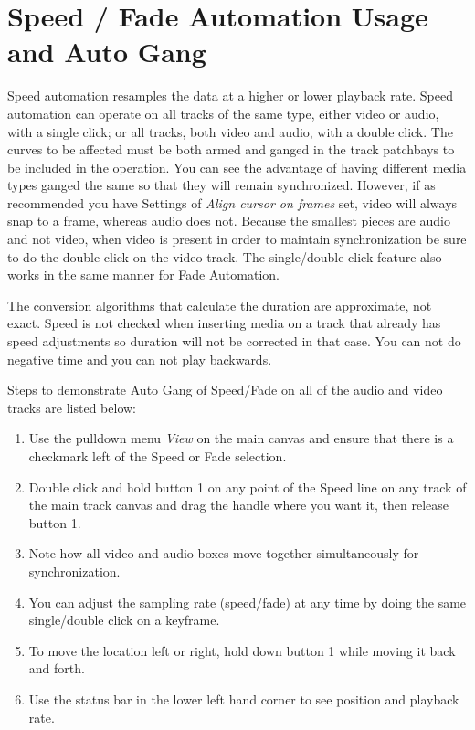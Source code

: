 \section{Speed / Fade Automation Usage and Auto Gang}%
\label{sec:speed_fade_automation_gang}

Speed automation resamples the data at a higher or lower playback rate. Speed automation can operate
on all tracks of the same type, either video or audio, with a single click; or all tracks, both video and
audio, with a double click. The curves to be affected must be both armed and ganged in the track
patchbays to be included in the operation. You can see the advantage of having different media types
ganged the same so that they will remain synchronized.  However, if as recommended you have Settings of \textit{Align cursor on frames} set, video will always snap to a frame, whereas audio does not.  Because the smallest pieces are audio and not video, when video is present in order to maintain synchronization be sure to do the double click on the video track.  The single/double click feature also works in the same manner for Fade Automation.

The conversion algorithms that calculate the duration are approximate, not exact.   Speed is not checked when inserting media on a track that already has speed adjustments so duration will not be corrected in that case.  You can not do negative time and you can not play backwards.

Steps to demonstrate Auto Gang of Speed/Fade on all of the audio and video tracks are listed below:

\begin{enumerate}
    \item Use the pulldown menu \textit{View} on the main canvas and ensure that there is a checkmark left of the Speed or Fade selection.
    \item Double click and hold button 1 on any point of the Speed line on any track of the main track canvas and drag the handle where you want it, then release button 1.
    \item Note how all video and audio boxes move together simultaneously for synchronization.
    \item You can adjust the sampling rate (speed/fade) at any time by doing the same single/double
    click on a keyframe.
    \item To move the location left or right, hold down button 1 while moving it back and forth.
    \item Use the status bar in the lower left hand corner to see position and playback rate.
\end{enumerate}

